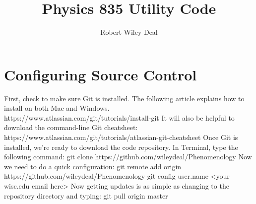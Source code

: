 \documentclass[11pt]{article} %
\title{Physics 835 Utility Code}
\author{Robert Wiley Deal}
\begin{document}
\maketitle

\section{Configuring Source Control}

First, check to make sure Git is installed. The following article explains how to install on both Mac and Windows.
\newline
https://www.atlassian.com/git/tutorials/install-git
\newline
\newline
It will also be helpful to download the command-line Git cheatsheet:
\newline
https://www.atlassian.com/git/tutorials/atlassian-git-cheatsheet
\newline
\newline
Once Git is installed, we're ready to download the code repository. In Terminal, type the following command:
\newline
git clone https://github.com/wileydeal/Phenomenology
\newline
\newline
Now we need to do a quick configuration:
\newline
git remote add origin https://github.com/wileydeal/Phenomenology
\newline
git config user.name \textless your wisc.edu email here\textgreater
\newline
\newline
Now getting updates is as simple as changing to the repository directory and typing: 
\newline
git pull origin master
\end{document}
